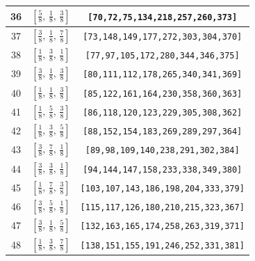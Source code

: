 \documentclass[fleqn,8pt]{jsarticle}
\begin{document}
\begin{longtable}{ccc}
36 & $\left[ \frac{5}{8},\, \frac{1}{8},\, \frac{3}{8} \right]$ & {\tt [70,72,75,134,218,257,260,373]} \\ \hline
37 & $\left[ \frac{3}{8},\, \frac{1}{8},\, \frac{7}{8} \right]$ & {\tt [73,148,149,177,272,303,304,370]} \\ \hline
38 & $\left[ \frac{1}{8},\, \frac{3}{8},\, \frac{1}{8} \right]$ & {\tt [77,97,105,172,280,344,346,375]} \\ \hline
39 & $\left[ \frac{3}{8},\, \frac{1}{8},\, \frac{3}{8} \right]$ & {\tt [80,111,112,178,265,340,341,369]} \\ \hline
40 & $\left[ \frac{1}{8},\, \frac{1}{8},\, \frac{3}{8} \right]$ & {\tt [85,122,161,164,230,358,360,363]} \\ \hline
41 & $\left[ \frac{1}{8},\, \frac{5}{8},\, \frac{3}{8} \right]$ & {\tt [86,118,120,123,229,305,308,362]} \\ \hline
42 & $\left[ \frac{1}{8},\, \frac{3}{8},\, \frac{5}{8} \right]$ & {\tt [88,152,154,183,269,289,297,364]} \\ \hline
43 & $\left[ \frac{3}{8},\, \frac{7}{8},\, \frac{1}{8} \right]$ & {\tt [89,98,109,140,238,291,302,384]} \\ \hline
44 & $\left[ \frac{3}{8},\, \frac{3}{8},\, \frac{1}{8} \right]$ & {\tt [94,144,147,158,233,338,349,380]} \\ \hline
45 & $\left[ \frac{1}{8},\, \frac{7}{8},\, \frac{3}{8} \right]$ & {\tt [103,107,143,186,198,204,333,379]} \\ \hline
46 & $\left[ \frac{3}{8},\, \frac{5}{8},\, \frac{1}{8} \right]$ & {\tt [115,117,126,180,210,215,323,367]} \\ \hline
47 & $\left[ \frac{3}{8},\, \frac{1}{8},\, \frac{5}{8} \right]$ & {\tt [132,163,165,174,258,263,319,371]} \\ \hline
48 & $\left[ \frac{1}{8},\, \frac{3}{8},\, \frac{7}{8} \right]$ & {\tt [138,151,155,191,246,252,331,381]} \\
\end{longtable}
\renewcommand{\arraystretch}{1.2}
\end{document}
